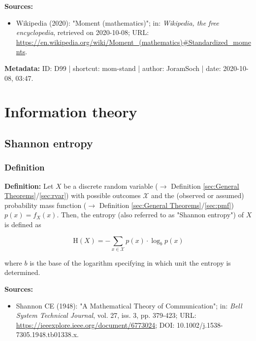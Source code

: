 \documentclass[a4paper,12pt,twoside]{book}
\begin{document}
\vspace{1em}
\textbf{Sources:}
\begin{itemize}
\item Wikipedia (2020): "Moment (mathematics)"; in: \textit{Wikipedia, the free encyclopedia}, retrieved on 2020-10-08; URL: \url{https://en.wikipedia.org/wiki/Moment_(mathematics)#Standardized_moments}.
\end{itemize}


\vspace{1em}
\textbf{Metadata:} ID: D99 | shortcut: mom-stand | author: JoramSoch | date: 2020-10-08, 03:47.
\vspace{1em}



\pagebreak
\section{Information theory}

\subsection{Shannon entropy}

\subsubsection[\textit{Definition}]{Definition} \label{sec:ent}
\setcounter{equation}{0}

\textbf{Definition:} Let $X$ be a discrete random variable ($\rightarrow$ Definition \ref{sec:General Theorems}/\ref{sec:rvar}) with possible outcomes $\mathcal{X}$ and the (observed or assumed) probability mass function ($\rightarrow$ Definition \ref{sec:General Theorems}/\ref{sec:pmf}) $p(x) = f_X(x)$. Then, the entropy (also referred to as "Shannon entropy") of $X$ is defined as

\begin{equation} \label{eq:ent-ent}
\mathrm{H}(X) = - \sum_{x \in \mathcal{X}} p(x) \cdot \log_b p(x)
\end{equation}

where $b$ is the base of the logarithm specifying in which unit the entropy is determined.


\vspace{1em}
\textbf{Sources:}
\begin{itemize}
\item Shannon CE (1948): "A Mathematical Theory of Communication"; in: \textit{Bell System Technical Journal}, vol. 27, iss. 3, pp. 379-423; URL: \url{https://ieeexplore.ieee.org/document/6773024}; DOI: 10.1002/j.1538-7305.1948.tb01338.x.
\end{itemize}
\end{document}
